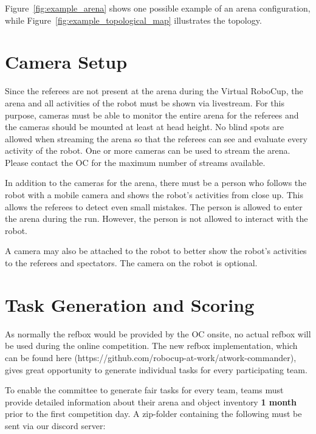 Figure~\ref{fig:example_arena} shows one possible example of an arena configuration, while Figure~\ref{fig:example_topological_map} illustrates the topology.



\section{Camera Setup} 
\label{sec:CameraSetup}


Since the referees are not present at the arena during the Virtual RoboCup, the arena and all activities of the robot must be shown via livestream. For this purpose, cameras must be able to monitor the entire arena for the referees and the cameras should be mounted at least at head height. No blind spots are allowed when streaming the arena so that the referees can see and evaluate every activity of the robot. One or more cameras can be used to stream the arena. Please contact the OC for the maximum number of streams available.
\par
In addition to the cameras for the arena, there must be a person who follows the robot with a mobile camera and shows the robot's activities from close up. This allows the referees to detect even small mistakes. The person is allowed to enter the arena during the run. However, the person is not allowed to interact with the robot.
\par
A camera may also be attached to the robot to better show the robot's activities to the referees and spectators. The camera on the robot is optional.


\section{Task Generation and Scoring} 
\label{sec:VRCTaskGen}

As normally the refbox would be provided by the OC onsite, no actual refbox will be used during the online competition.
The new refbox implementation, which can be found here (https://github.com/robocup-at-work/atwork-commander), 
gives great opportunity to generate individual tasks for every participating team.

To enable the committee to generate fair tasks for every team, teams must provide detailed information about their arena and object inventory \textbf{1 month} prior to the first competition day. A zip-folder containing the following must be sent via our discord server:

